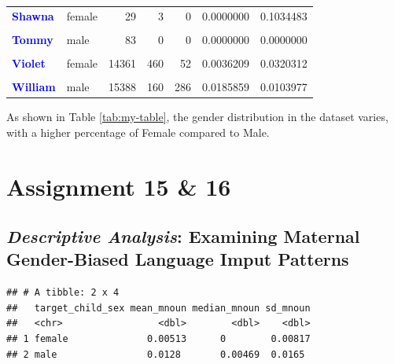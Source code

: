 \documentclass[
  man]{apa6}
\begin{document}
\begin{table}[!h]
\begin{tabular}[t]{>{}llrrrrr}
\textcolor{blue}{\textbf{Shawna}} & female & 29 & 3 & 0 & 0.0000000 & 0.1034483\\
\addlinespace
\textcolor{blue}{\textbf{\cellcolor{gray!10}{Stephen}}} & \cellcolor{gray!10}{male} & \cellcolor{gray!10}{153} & \cellcolor{gray!10}{0} & \cellcolor{gray!10}{2} & \cellcolor{gray!10}{0.0130719} & \cellcolor{gray!10}{0.0000000}\\
\textcolor{blue}{\textbf{Tommy}} & male & 83 & 0 & 0 & 0.0000000 & 0.0000000\\
\textcolor{blue}{\textbf{\cellcolor{gray!10}{Victor}}} & \cellcolor{gray!10}{male} & \cellcolor{gray!10}{504} & \cellcolor{gray!10}{6} & \cellcolor{gray!10}{2} & \cellcolor{gray!10}{0.0039683} & \cellcolor{gray!10}{0.0119048}\\
\textcolor{blue}{\textbf{Violet}} & female & 14361 & 460 & 52 & 0.0036209 & 0.0320312\\
\textcolor{blue}{\textbf{\cellcolor{gray!10}{Wendy}}} & \cellcolor{gray!10}{female} & \cellcolor{gray!10}{195} & \cellcolor{gray!10}{3} & \cellcolor{gray!10}{1} & \cellcolor{gray!10}{0.0051282} & \cellcolor{gray!10}{0.0153846}\\
\addlinespace
\textcolor{blue}{\textbf{William}} & male & 15388 & 160 & 286 & 0.0185859 & 0.0103977\\
\bottomrule
\end{tabular}
\end{table}

As shown in Table \ref{tab:my-table}, the gender distribution in the dataset varies, with a higher percentage of Female compared to Male.

\hypertarget{assignment-15-16}{%
\section{Assignment 15 \& 16}\label{assignment-15-16}}

\hypertarget{descriptive-analysis-examining-maternal-gender-biased-language-imput-patterns}{%
\subsection{\texorpdfstring{\emph{Descriptive Analysis}: Examining Maternal Gender-Biased Language Imput Patterns}{Descriptive Analysis: Examining Maternal Gender-Biased Language Imput Patterns}}\label{descriptive-analysis-examining-maternal-gender-biased-language-imput-patterns}}

\begin{verbatim}
## # A tibble: 2 x 4
##   target_child_sex mean_mnoun median_mnoun sd_mnoun
##   <chr>                 <dbl>        <dbl>    <dbl>
## 1 female              0.00513      0        0.00817
## 2 male                0.0128       0.00469  0.0165
\end{verbatim}
\end{document}
